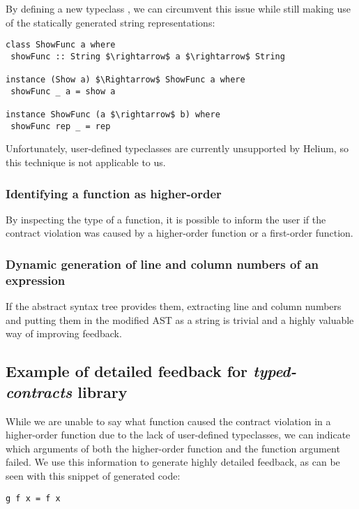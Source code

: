\documentclass[10pt]{report}
\newcommand{\code}[1]{%
  {%
   \setlength{\fboxsep}{-2\fboxrule}%
   \fcolorbox{black}{light-gray}{\hspace{1.5pt}\strut\texttt{#1}\hspace{1.5pt}}%
  }%
}
\begin{document}
{By defining a new typeclass \code{ShowFunc}, we can circumvent this issue while still making use of the statically generated string representations:

\begin{lstlisting}[mathescape]
class ShowFunc a where
 showFunc :: String $\rightarrow$ a $\rightarrow$ String
 
instance (Show a) $\Rightarrow$ ShowFunc a where
 showFunc _ a = show a
 
instance ShowFunc (a $\rightarrow$ b) where
 showFunc rep _ = rep
\end{lstlisting}

Unfortunately, user-defined typeclasses are currently unsupported by Helium, so this technique is not applicable to us.

\subsubsection{Identifying a function as higher-order}

By inspecting the type of a function, it is possible to inform the user if the contract violation was caused by a higher-order function or a first-order function.

\subsubsection{Dynamic generation of line and column numbers of an expression}

If the abstract syntax tree provides them, extracting line and column numbers and putting them in the modified AST as a string is trivial and a highly valuable way of improving feedback.

\subsection{Example of detailed feedback for \textit{typed-contracts} library}

While we are unable to say what function caused the contract violation in a higher-order function due to the lack of user-defined typeclasses, we can indicate which arguments of both the higher-order function and the function argument failed.
We use this information to generate highly detailed feedback, as can be seen with this snippet of generated code:

\begin{lstlisting}
g f x = f x
\end{lstlisting}

}
\end{document}
